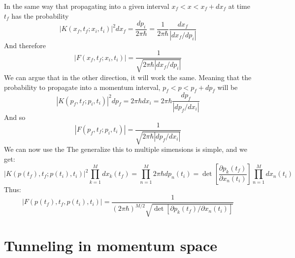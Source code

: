 \documentclass{article}
\begin{document}
In the same way that propagating into a given interval $x_f < x < x_f + dx_f$ at time $t_f$ has the probability
\begin{equation}
    \left| K(x_f, t_f ; x_i, t_i)\right|^2dx_f = \frac{dp_i}{2\pi\hbar} = \frac{1}{2\pi\hbar}\frac{dx_f}{\left|dx_f/dp_i\right|}
\end{equation}
And therefore
\begin{equation}
    \left|F(x_f, t_f;x_i, t_i)\right| = \frac{1}{\sqrt{2\pi\hbar\left|dx_f/dp_i\right|}}
\end{equation}
We can argue that in the other direction, it will work the same. Meaning that the probability to propagate into a momentum interval, $p_f < p < p_f + dp_f$ will be
\begin{equation}
    \left| K(p_f, t_f ; p_i, t_i)\right|^2dp_f = 2\pi\hbar dx_i = 2\pi\hbar\frac{dp_f}{\left|dp_f/dx_i\right|}
\end{equation}
And so
\begin{equation}
    \left|F(p_f, t_f; p_i, t_i)\right| = \frac{1}{\sqrt{2\pi\hbar\left|dp_f/dx_i\right|}}
\end{equation}
We can now use the
The generalize this to multiple simensions is simple, and we get:
\begin{equation}
    \left| K(p(t_f), t_f ; p(t_i), t_i)\right|^2 \prod_{k=1}^M dx_k(t_f) = \prod_{n=1}^M 2\pi\hbar dp_n(t_i) = \det\left[\frac{\partial p_k(t_f)}{\partial x_n(t_i)}\right] \prod_{n=1}^M dx_n(t_i)
\end{equation}
Thus:
\begin{equation}
    \left|F(p(t_f), t_f, p(t_i), t_i)\right| = \frac{1}{\left(2\pi\hbar\right)^{M/2}\sqrt{\det\left[\partial p_k(t_f)/\partial x_n (t_i)\right]}}
\end{equation}

\section{Tunneling in momentum space}
\end{document}
